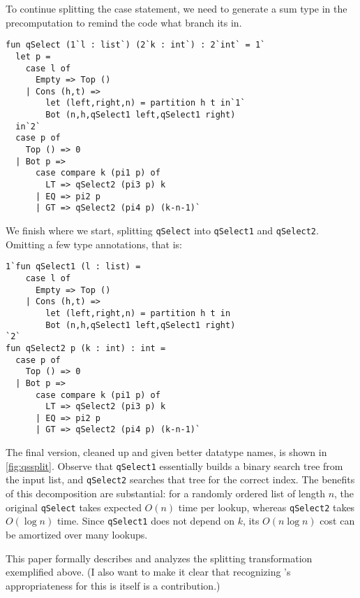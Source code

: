 To continue splitting the case statement, we need to generate a sum type in the precomputation
to remind the code what branch its in.

\begin{lstlisting} 
fun qSelect (1`l : list`) (2`k : int`) : 2`int` = 1`
  let p = 
    case l of
      Empty => Top ()
    | Cons (h,t) =>
        let (left,right,n) = partition h t in`1`
        Bot (n,h,qSelect1 left,qSelect1 right)
  in`2`
  case p of 
    Top () => 0
  | Bot p => 
      case compare k (pi1 p) of
        LT => qSelect2 (pi3 p) k
      | EQ => pi2 p
      | GT => qSelect2 (pi4 p) (k-n-1)`
\end{lstlisting}

We finish where we start, splitting \texttt{qSelect} into
\texttt{qSelect1} and \texttt{qSelect2}.  
Omitting a few type annotations, that is:

\begin{lstlisting} 
1`fun qSelect1 (l : list) = 
    case l of
      Empty => Top ()
    | Cons (h,t) =>
        let (left,right,n) = partition h t in
        Bot (n,h,qSelect1 left,qSelect1 right)
`2`
fun qSelect2 p (k : int) : int = 
  case p of 
    Top () => 0
  | Bot p => 
      case compare k (pi1 p) of
        LT => qSelect2 (pi3 p) k
      | EQ => pi2 p
      | GT => qSelect2 (pi4 p) (k-n-1)`
\end{lstlisting}

The final version, cleaned up and given better datatype names, is shown in \ref{fig:qssplit}.
Observe that \texttt{qSelect1} essentially builds a binary search tree from the input list, 
and \texttt{qSelect2} searches that tree for the correct index.
The benefits of this decomposition are substantial: for a randomly ordered list of length $n$, 
the original \texttt{qSelect} takes expected $O(n)$ time per lookup, 
whereas \texttt{qSelect2} takes $O(\log n)$ time.
Since \texttt{qSelect1} does not depend on $k$, its $O(n\log n)$ cost can be amortized over many lookups.


This paper formally describes and analyzes the splitting transformation exemplified above.
(I also want to make it clear that recognizing \lang's appropriateness for this is itself is a contribution.)

